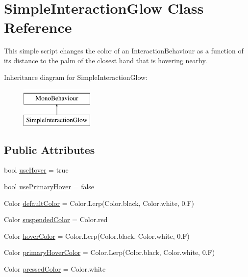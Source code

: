 \hypertarget{class_simple_interaction_glow}{}\section{Simple\+Interaction\+Glow Class Reference}
\label{class_simple_interaction_glow}


This simple script changes the color of an Interaction\+Behaviour as a function of its distance to the palm of the closest hand that is hovering nearby.  


Inheritance diagram for Simple\+Interaction\+Glow\+:\begin{figure}[H]
\begin{center}
\leavevmode
\includegraphics[height=2.000000cm]{class_simple_interaction_glow}
\end{center}
\end{figure}
\subsection*{Public Attributes}
\begin{DoxyCompactItemize}
\item 
bool \mbox{\hyperlink{class_simple_interaction_glow_a346b18ca3d0426fbfc5079e02c515e71}{use\+Hover}} = true
\item 
bool \mbox{\hyperlink{class_simple_interaction_glow_a5c714fc869447c5e0d485b0122188055}{use\+Primary\+Hover}} = false
\item 
Color \mbox{\hyperlink{class_simple_interaction_glow_a00cd6d0367cc6ad0f3fc84d5de82bdc0}{default\+Color}} = Color.\+Lerp(Color.\+black, Color.\+white, 0.\+F)
\item 
Color \mbox{\hyperlink{class_simple_interaction_glow_a2c27dd04abd3d432865df53f2abe562c}{suspended\+Color}} = Color.\+red
\item 
Color \mbox{\hyperlink{class_simple_interaction_glow_aa12a1f2aa05a0b0a0c421b2c93c17674}{hover\+Color}} = Color.\+Lerp(Color.\+black, Color.\+white, 0.\+F)
\item 
Color \mbox{\hyperlink{class_simple_interaction_glow_a758d68c986bc34965a5a6aebf8f6e1f2}{primary\+Hover\+Color}} = Color.\+Lerp(Color.\+black, Color.\+white, 0.\+F)
\item 
Color \mbox{\hyperlink{class_simple_interaction_glow_a09bef1794224eada8c49258bb4ab0b04}{pressed\+Color}} = Color.\+white
\end{DoxyCompactItemize}


